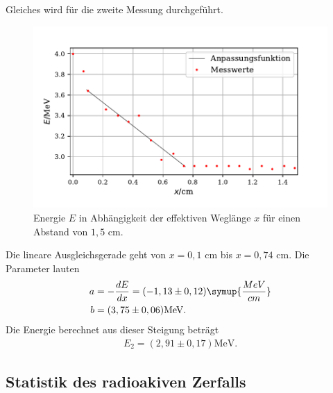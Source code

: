 Gleiches wird für die zweite Messung durchgeführt. 
\begin{figure}[H]
  \centering
  \includegraphics{plot4.pdf}
  \caption{Energie $E$ in Abhängigkeit der effektiven Weglänge $x$ für einen Abstand von $1,5$ $\si{\cm}$. }
  \label{fig:plot}
\end{figure}
Die lineare Ausgleichsgerade geht von $x=0,1$ $\si{\cm}$ bis $x=0,74$ $\si{\cm}$. Die Parameter lauten
\begin{align*}
a &= -\frac{dE}{dx} = (-1,13 \pm 0,12) \symup{\frac{MeV}{cm}} \\
b &= (3,75 \pm 0,06) \si{\MeV}.
\end{align*}
Die Energie berechnet aus dieser Steigung beträgt
\begin{align*}
E_2 = (2,91 \pm 0,17) \si{\MeV}. %
\end{align*}



\subsection{Statistik des radioakiven Zerfalls}

